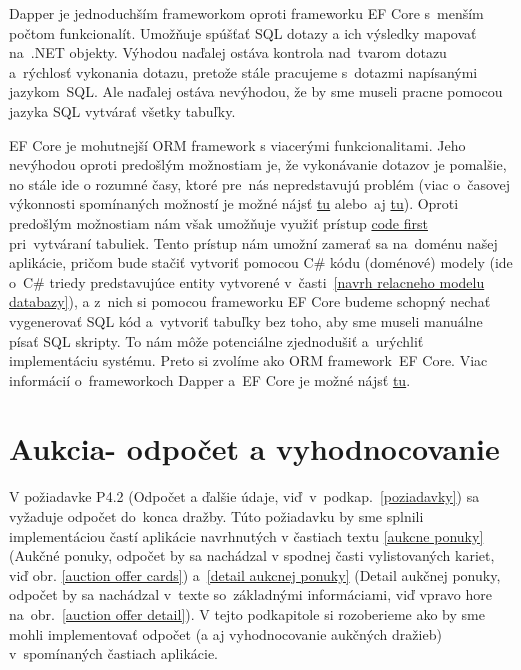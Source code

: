 Dapper je jednoduchším frameworkom oproti frameworku EF Core s~menším počtom funkcionalít. Umožňuje spúšťať SQL dotazy a ich výsledky mapovať na~.NET objekty. Výhodou naďalej ostáva kontrola nad~tvarom dotazu a~rýchlosť vykonania dotazu, pretože stále pracujeme s~dotazmi napísanými jazykom~SQL. Ale naďalej ostáva nevýhodou, že by sme museli pracne pomocou jazyka SQL vytvárať všetky tabuľky.

EF Core je mohutnejší ORM framework s viacerými funkcionalitami. Jeho nevýhodou oproti predošlým možnostiam je, že vykonávanie dotazov je pomalšie, no stále ide o rozumné časy, ktoré pre~nás nepredstavujú problém (viac o~časovej výkonnosti spomínaných možností je možné nájsť \href{https://github.com/DapperLib/Dapper\#performance}{tu} alebo~aj \href{https://levelup.gitconnected.com/dapper-vs-ef-core-which-orm-framework-should-you-choose-for-your-net-application-54f2723b176a}{tu}). Oproti predošlým možnostiam nám však umožňuje využiť prístup \href{https://www.entityframeworktutorial.net/code-first/what-is-code-first.aspx}{code first} pri~vytváraní tabuliek. Tento prístup nám umožní zamerať sa na~doménu našej aplikácie, pričom bude stačiť vytvoriť pomocou C\# kódu (doménové) modely (ide o~C\# triedy predstavujúce entity vytvorené v~časti~\ref{navrh relacneho modelu databazy}), a z~nich si pomocou frameworku EF Core budeme schopný nechať vygenerovať SQL kód a~vytvoriť tabuľky bez toho, aby sme museli manuálne písať SQL skripty. To nám môže potenciálne zjednodušiť a~urýchliť implementáciu systému. Preto si zvolíme ako ORM framework~EF Core. Viac informácií o~frameworkoch Dapper a~EF Core je možné nájsť \href{https://www.c-sharpcorner.com/article/dapper-vs-entity-framework-core/}{tu}.

\section{Aukcia- odpočet a vyhodnocovanie}
\label{aukcia odpocet a vyhodnocovanie}

V požiadavke P4.2 (Odpočet a ďalšie údaje, viď~v~podkap.~\ref{poziadavky}) sa vyžaduje odpočet do~konca dražby. Túto požiadavku by sme splnili implementáciou častí aplikácie navrhnutých v častiach textu \ref{aukcne ponuky} (Aukčné ponuky, odpočet by sa nachádzal v spodnej časti vylistovaných kariet, viď obr. \ref{auction offer cards}) a~\ref{detail aukcnej ponuky} (Detail aukčnej ponuky, odpočet by sa nachádzal v~texte so~základnými informáciami, viď vpravo hore na~obr.~\ref{auction offer detail}). V tejto podkapitole si rozoberieme ako by sme mohli implementovať odpočet (a aj vyhodnocovanie aukčných dražieb) v~spomínaných častiach aplikácie.

